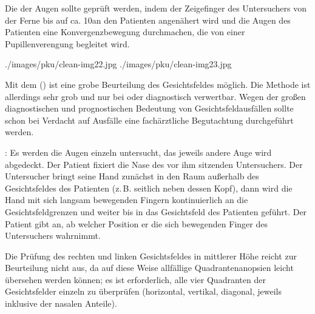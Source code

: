 
Die  der Augen sollte geprüft
werden, indem der Zeigefinger des Untersuchers von der Ferne bis auf
ca. 10\CM* an den Patienten
angenähert wird und die Augen des Patienten eine Konvergenzbewegung
durchmachen, die von einer Pupillenverengung begleitet wird.

\begin{PictureSeries}{}{}
{./images/pku/clean-img22.jpg}
{}
{./images/pku/clean-img23.jpg}
{}
{}
{}
{}
{}
\end{PictureSeries}



{Mit dem  ()
ist eine grobe Beurteilung des Gesichtsfeldes möglich. Die
Methode ist allerdings sehr grob und nur bei
 oder  diagnostisch
verwertbar. Wegen der großen diagnostischen und
prognostischen Bedeutung von Gesichtsfeldausfällen sollte
schon bei Verdacht auf Ausfälle eine fachärztliche
Begutachtung durchgeführt werden.

: Es werden die Augen einzeln untersucht, 
das jeweils andere Auge wird abgedeckt.
Der Patient fixiert die Nase des vor ihm
sitzenden Untersuchers. Der Untersucher bringt seine Hand zunächst in
den Raum außerhalb des Gesichtsfeldes des Patienten (z.\,B.
seitlich neben dessen Kopf), dann wird die Hand mit sich
langsam bewegenden Fingern kontinuierlich an die
Gesichtsfeldgrenzen und weiter bis in das Gesichtsfeld des
Patienten geführt. Der Patient gibt an, ab welcher Position
er die sich bewegenden Finger des Untersuchers
wahrnimmt.~\cite{Zeiler2001}

Die Prüfung des rechten und linken Gesichtsfeldes in
mittlerer Höhe reicht zur Beurteilung nicht aus, da auf
diese Weise allfällige Quadrantenanopsien leicht übersehen
werden können; es ist erforderlich, alle vier Quadranten der
Gesichtsfelder einzeln zu überprüfen (horizontal, vertikal,
diagonal, jeweils inklusive der nasalen Anteile).~\cite{Zeiler2001}


}{%
\begin{PkuBefunde}[]
  \item[\SymbolPkuNormal] 
  \item[\SymbolFindingPathological] 
\end{PkuBefunde}
}{}{}{}


